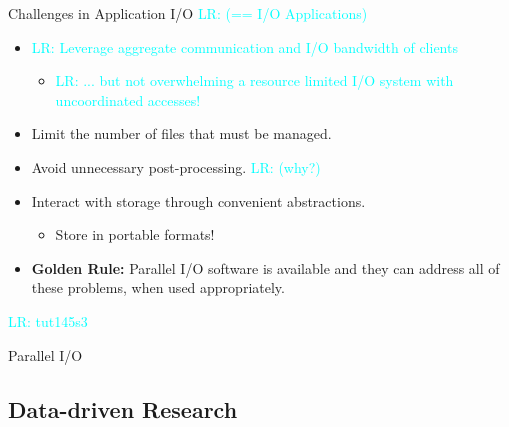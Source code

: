 \documentclass[compress,11pt,xcolor=svgnames,aspectratio=169]{beamer}
\newcommand{\lr}[1]{\textcolor{cyan}{LR: #1}}
\begin{document}
\begin{frame}[t]{Challenges in Application I/O \lr{(== I/O Applications)}}

\begin{itemize}
\setlength\itemsep{0.4cm}

\item \lr{Leverage aggregate communication and I/O bandwidth of clients}
    \begin{itemize}
        \item \lr{... but not overwhelming a resource limited I/O system with uncoordinated accesses!}
    \end{itemize}

\item Limit the number of files that must be managed.

\item Avoid unnecessary post-processing. \lr{(why?)}

\item Interact with storage through convenient abstractions.
    \begin{itemize}
      \item Store in portable formats!
    \end{itemize}

\item {\color{gold}\textbf{Golden Rule:}} Parallel I/O software is available and they can address all
of these problems, when used appropriately.

\end{itemize}


\lr{tut145s3}

\end{frame}

\begin{frame}[t]{Parallel I/O}

\end{frame}

\subsection{Data-driven Research}
\end{document}
